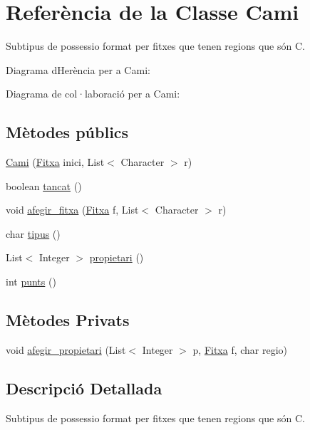 \hypertarget{class_cami}{}\section{Referència de la Classe Cami}
\label{class_cami}


Subtipus de possessio format per fitxes que tenen regions que són C.  




Diagrama d\textquotesingle{}Herència per a Cami\+:


Diagrama de col·laboració per a Cami\+:
\subsection*{Mètodes públics}
\begin{DoxyCompactItemize}
\item 
\mbox{\hyperlink{class_cami_a212b05de3f803472fb27fd121c2fa674}{Cami}} (\mbox{\hyperlink{class_fitxa}{Fitxa}} inici, List$<$ Character $>$ r)
\item 
boolean \mbox{\hyperlink{class_cami_a52921b82d752559596aab860d75e6077}{tancat}} ()
\item 
void \mbox{\hyperlink{class_cami_abbc38e23b41d673e78f8f9e9fef0890b}{afegir\+\_\+fitxa}} (\mbox{\hyperlink{class_fitxa}{Fitxa}} f, List$<$ Character $>$ r)
\item 
char \mbox{\hyperlink{class_cami_a223743f7fcdcf421994ce0267e95f98e}{tipus}} ()
\item 
List$<$ Integer $>$ \mbox{\hyperlink{class_cami_aae88bb5689726211e87747aeeb6abad0}{propietari}} ()
\item 
int \mbox{\hyperlink{class_cami_a8d0a4b74b03239864c2d55217c99ed20}{punts}} ()
\end{DoxyCompactItemize}
\subsection*{Mètodes Privats}
\begin{DoxyCompactItemize}
\item 
void \mbox{\hyperlink{class_cami_a768f6b93fa51199b1db2806157816685}{afegir\+\_\+propietari}} (List$<$ Integer $>$ p, \mbox{\hyperlink{class_fitxa}{Fitxa}} f, char regio)
\end{DoxyCompactItemize}


\subsection{Descripció Detallada}
Subtipus de possessio format per fitxes que tenen regions que són C. 

